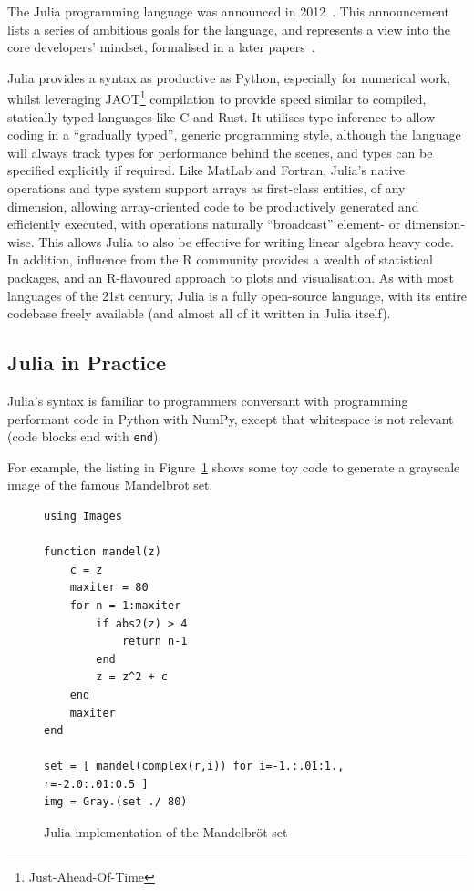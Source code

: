 \documentclass{webofc}
\begin{document}
The Julia programming language was announced in 2012~\cite{why-create-julia}. This announcement lists a series of
ambitious goals for the language, and represents a view into the core
developers' mindset, formalised in a later
papers~\cite{bib:julia_freshapproach,10.1145/3276490}.

Julia provides a syntax as productive as Python, especially for numerical work,
whilst leveraging JAOT\footnote{Just-Ahead-Of-Time} compilation to provide speed
similar to compiled, statically typed languages like C and Rust. It utilises
type inference to allow coding in a ``gradually typed'', generic programming
style, although the language will always track types for performance behind the
scenes, and types can be specified explicitly if required. Like MatLab and
Fortran, Julia's native operations and type system support arrays as first-class
entities, of any dimension, allowing array-oriented code to be productively
generated and efficiently executed, with operations naturally ``broadcast''
element- or dimension-wise. This allows Julia to also be effective for writing
linear algebra heavy code. In addition, influence from the R community provides
a wealth of statistical packages, and an R-flavoured approach to plots and
visualisation. As with most languages of the 21st century, Julia is a
fully open-source language, with its entire codebase freely available (and
almost all of it written in Julia itself).

\subsection{Julia in Practice}
\label{sec:juliainpractice}

Julia's syntax is familiar to programmers conversant with programming performant
code in Python with NumPy, except that whitespace is not relevant
(code blocks end with \texttt{end}).

For example, the listing in Figure~\ref{code:madelbrot} shows some toy code to
generate a grayscale image of the famous Mandelbröt set.

\begin{figure}[!ht]
\centering
\begin{verbatim}
using Images

function mandel(z)
    c = z
    maxiter = 80
    for n = 1:maxiter
        if abs2(z) > 4
            return n-1
        end
        z = z^2 + c
    end
    maxiter
end

set = [ mandel(complex(r,i)) for i=-1.:.01:1., r=-2.0:.01:0.5 ]
img = Gray.(set ./ 80)
\end{verbatim}
\caption{Julia implementation of the Mandelbr\"{o}t set}
\label{code:madelbrot}
\end{figure}
\end{document}
